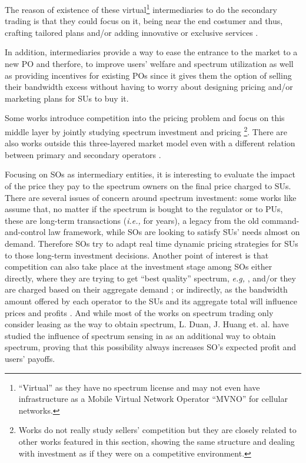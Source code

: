 The reason of existence of these virtual\footnote{``Virtual'' as they have no spectrum license and may not even have infrastructure as a Mobile Virtual Network Operator ``MVNO'' for cellular networks.} intermediaries to do the secondary trading is that they could focus on it, being near the end costumer and thus, crafting tailored plans and/or adding innovative or exclusive services \cite{ref:Duan2010_Comp,ref:Levi2012}.

In addition, intermediaries provide a way to ease the entrance to the market to a new PO and therfore, to improve users' welfare and spectrum utilization as well as providing incentives for existing POs since it gives them the option of selling their bandwidth excess without having to worry about designing pricing and/or marketing plans for SUs to buy it. 

Some works introduce competition into the pricing problem and focus on this middle layer by jointly studying spectrum investment and pricing \cite{ref:Jia2008,ref:Duan2010_Cog,ref:Duan2010_Comp,ref:Duan2011_Duo,ref:Duan2011_Inves,ref:Kim2011}\footnote{Works \cite{ref:Duan2010_Cog,ref:Duan2011_Inves} do not really study sellers' competition but they are closely related to other works featured in this section, showing the same structure and dealing with investment as if they were on a competitive environment.}. There are also works outside this three-layered market model \cite{ref:Illeri2005,ref:Xing2007,ref:Maille2009,ref:Dixit2010} even with a different relation between primary and secondary operators \cite{ref:Guijarro2011}.

Focusing on SOs as intermediary entities, it is interesting to evaluate the impact of the price they pay to the spectrum owners on the final price charged to SUs. There are several issues of concern around spectrum investment: some works like \cite{ref:Jia2008} assume that, no matter if the spectrum is bought to the regulator or to PUs, these are long-term transactions (\textit{i.e.,} for years), a legacy from the old command-and-control law framework, while SOs are looking to satisfy SUs' needs almost on demand. Therefore SOs try to adapt real time dynamic pricing strategies for SUs to those long-term investment decisions. Another point of interest is that competition can also take place at the investment stage among SOs either directly, where they are trying to get ``best quality'' spectrum, \textit{e.g,} \cite{ref:Kim2011}, and/or they are charged based on their aggregate demand \cite{ref:Jia2008}; or indirectly, as the bandwidth amount offered by each operator to the SUs and its aggregate total will influence prices and profits \cite{ref:Duan2010_Comp}. And while most of the works on spectrum trading only consider leasing as the way to obtain spectrum, L. Duan, J. Huang et. al. have studied the influence of spectrum sensing in \cite{ref:Duan2010_Cog,ref:Duan2011_Inves} as an additional way to obtain spectrum, proving that this possibility always increases SO's expected profit and users' payoffs. 

